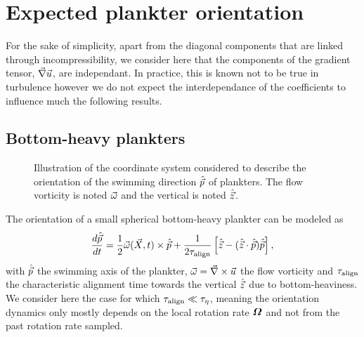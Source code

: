 \chapter{Expected plankter orientation}\label{app:orientation_statistics}

For the sake of simplicity, apart from the diagonal components that are linked through incompressibility, we consider here that the components of the gradient tensor, $\vec{\nabla} \vec{u}$, are independant.
In practice, this is known not to be true in turbulence however we do not expect the interdependance of the coefficients to influence much the following results.

\section{Bottom-heavy plankters}

\begin{wrapfigure}[15]{L}[0.5\width]{0.42\textwidth}
	\centering
	\vspace{-20pt}
	\def\svgwidth{0.38\textwidth}
	
	\captionsetup{width=0.38\textwidth}
  	\caption{
  		Illustration of the coordinate system considered to describe the orientation of the swimming direction $\hat{\vec{p}}$ of plankters.
  		The flow vorticity is noted $\vec{\omega}$ and the vertical is noted $\hat{\vec{z}}$.
  	}
  	\label{fig:bottom_heavy_coordinate_system}
\end{wrapfigure}
The orientation of a small spherical bottom-heavy plankter can be modeled as \citep{Pedley1992}
\begin{equation}
	\frac{d \hat{\vec{p}}}{d t}  =
	\frac{1}{2} \vec{\omega} (\vec{X}, t) \times \hat{\vec{p}} + \frac{1}{2 \tau_{\mathrm{align}}} \left[ \hat{\vec{z}} - (\hat{\vec{z}} \cdot \hat{\vec{p}}) \hat{\vec{p}} \right],
\end{equation}
with $\hat{\vec{p}}$ the swimming axis of the plankter, $\vec{\omega} = \vec{\nabla} \times \vec{u}$ the flow vorticity and $\tau_{\mathrm{align}}$ the characteristic alignment time towards the vertical $\hat{\vec{z}}$ due to bottom-heaviness.
We consider here the case for which $\tau_{\mathrm{align}} \ll \tau_{\eta}$, meaning the orientation dynamics only mostly depends on the local rotation rate $\boldsymbol{\varOmega}$ and not from the past rotation rate sampled.

